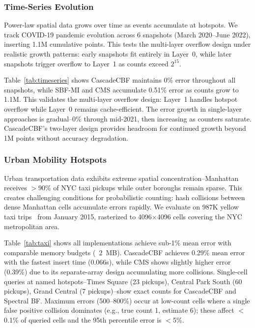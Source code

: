 \documentclass[agile, final]{copernicus-agile}
\begin{document}
\subsubsection{Time-Series Evolution}

Power-law spatial data grows over time as events accumulate at hotspots. We track COVID-19 pandemic evolution across 6 snapshots (March 2020--June 2022), inserting 1.1M cumulative points. This tests the multi-layer overflow design under realistic growth patterns: early snapshots fit entirely in Layer~0, while later snapshots trigger overflow to Layer~1 as counts exceed $2^{15}$.


Table~\ref{tab:timeseries} shows CascadeCBF maintains 0\% error throughout all snapshots, while SBF-MI and CMS accumulate 0.51\% error as counts grow to 1.1M. This validates the multi-layer overflow design: Layer~1 handles hotspot overflow while Layer~0 remains cache-efficient. The error growth in single-layer approaches is gradual--0\% through mid-2021, then increasing as counters saturate. CascadeCBF's two-layer design provides headroom for continued growth beyond 1M points without accuracy degradation.

\subsubsection{Urban Mobility Hotspots}


Urban transportation data exhibits extreme spatial concentration--Manhattan receives $>$90\% of NYC taxi pickups while outer boroughs remain sparse. This creates challenging conditions for probabilistic counting: hash collisions between dense Manhattan cells accumulate errors rapidly. We evaluate on 987K yellow taxi trips~\citep{nyc_tlc_data} from January 2015, rasterized to 4096$\times$4096 cells covering the NYC metropolitan area.


Table~\ref{tab:taxi} shows all implementations achieve sub-1\% mean error with comparable memory budgets (~2~MB). CascadeCBF achieves 0.29\% mean error with the fastest insert time (0.066s), while CMS shows slightly higher error (0.39\%) due to its separate-array design accumulating more collisions. Single-cell queries at named hotspots--Times Square (23 pickups), Central Park South (60 pickups), Grand Central (7 pickups)--show exact counts for CascadeCBF and Spectral BF. Maximum errors (500--800\%) occur at low-count cells where a single false positive collision dominates (e.g., true count 1, estimate 6); these affect $<$0.1\% of queried cells and the 95th percentile error is $<$5\%.
\end{document}
